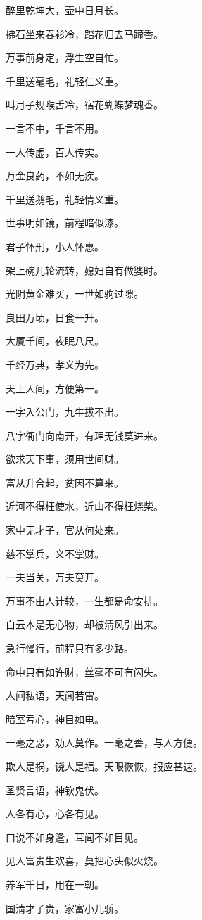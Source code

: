 \documentclass[12pt,oneside]{book}
\begin{document}
醉里乾坤大，壶中日月长。

拂石坐来春衫冷，踏花归去马蹄香。

万事前身定，浮生空自忙。

千里送毫毛，礼轻仁义重。

叫月子规喉舌冷，宿花蝴蝶梦魂香。

一言不中，千言不用。

一人传虚，百人传实。

万金良药，不如无疾。

千里送鹅毛，礼轻情义重。

世事明如镜，前程暗似漆。

君子怀刑，小人怀惠。

架上碗儿轮流转，媳妇自有做婆时。

光阴黄金难买，一世如驹过隙。

良田万顷，日食一升。

大厦千间，夜眠八尺。

千经万典，孝义为先。

天上人间，方便第一。

一字入公门，九牛拔不出。

八字衙门向南开，有理无钱莫进来。

欲求天下事，须用世间财。

富从升合起，贫因不算来。

近河不得枉使水，近山不得枉烧柴。

家中无才子，官从何处来。

慈不掌兵，义不掌财。

一夫当关，万夫莫开。

万事不由人计较，一生都是命安排。

白云本是无心物，却被淸风引出来。

急行慢行，前程只有多少路。

命中只有如许财，丝毫不可有闪失。

人间私语，天闻若雷。

暗室亏心，神目如电。

一毫之恶，劝人莫作。一毫之善，与人方便。

欺人是祸，饶人是福。天眼恢恢，报应甚速。

圣贤言语，神钦鬼伏。

人各有心，心各有见。

口说不如身逢，耳闻不如目见。

见人富贵生欢喜，莫把心头似火烧。

养军千日，用在一朝。

国淸才子贵，家富小儿骄。
\end{document}
